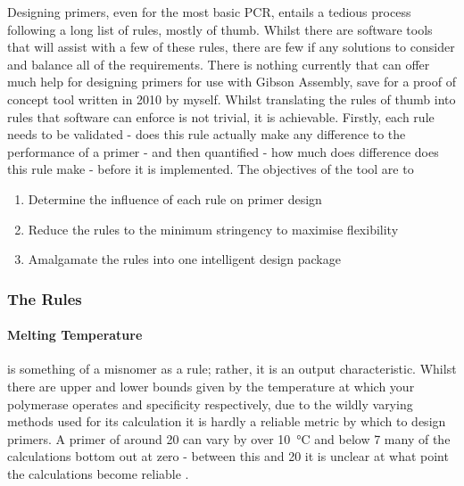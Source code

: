 \documentclass[../main.tex]{subfiles}
\begin{document}
Designing primers, even for the most basic PCR, entails a tedious process following a long list of rules, mostly of thumb. Whilst there are software tools that will assist with a few of these rules, there are few if any solutions to consider and balance all of the requirements. There is nothing currently that can offer much help for designing primers for use with Gibson Assembly, save for a proof of concept tool written in 2010 by myself. Whilst translating the rules of thumb into rules that software can enforce is not trivial, it is achievable. Firstly, each rule needs to be validated - does this rule actually make any difference to the performance of a primer - and then quantified - how much does difference does this rule make - before it is implemented. The objectives of the tool are to 
\begin{enumerate}
\item{Determine the influence of each rule on primer design}
\item{Reduce the rules to the minimum stringency to maximise flexibility}
\item{Amalgamate the rules into one intelligent design package}
\end{enumerate}

\subsubsection{The Rules}

\paragraph{Melting Temperature} is something of a misnomer as a rule; rather, it is an output characteristic. Whilst there are upper and lower bounds given by the temperature at which your polymerase operates and specificity respectively, due to the wildly varying methods used for its calculation it is hardly a reliable metric by which to design primers. A primer of around \SI{20}{\base} can vary by over \SI{10}{\degreeCelsius} and below \SI{7}{\base} many of the calculations bottom out at zero - between this and \SI{20}{\base} it is unclear at what point the calculations become reliable .
\end{document}
